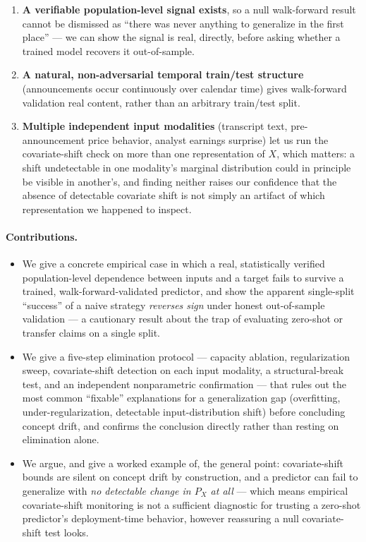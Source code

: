 \documentclass[11pt]{article}
\begin{document}
\begin{enumerate}
  \item \textbf{A verifiable population-level signal exists}, so a null walk-forward result cannot be dismissed as ``there was never anything to generalize in the first place'' --- we can show the signal is real, directly, before asking whether a trained model recovers it out-of-sample.
  \item \textbf{A natural, non-adversarial temporal train/test structure} (announcements occur continuously over calendar time) gives walk-forward validation real content, rather than an arbitrary train/test split.
  \item \textbf{Multiple independent input modalities} (transcript text, pre-announcement price behavior, analyst earnings surprise) let us run the covariate-shift check on more than one representation of $X$, which matters: a shift undetectable in one modality's marginal distribution could in principle be visible in another's, and finding neither raises our confidence that the absence of detectable covariate shift is not simply an artifact of which representation we happened to inspect.
\end{enumerate}

\paragraph{Contributions.}
\begin{itemize}
  \item We give a concrete empirical case in which a real, statistically verified population-level dependence between inputs and a target fails to survive a trained, walk-forward-validated predictor, and show the apparent single-split ``success'' of a naive strategy \emph{reverses sign} under honest out-of-sample validation --- a cautionary result about the trap of evaluating zero-shot or transfer claims on a single split.
  \item We give a five-step elimination protocol --- capacity ablation, regularization sweep, covariate-shift detection on each input modality, a structural-break test, and an independent nonparametric confirmation --- that rules out the most common ``fixable'' explanations for a generalization gap (overfitting, under-regularization, detectable input-distribution shift) before concluding concept drift, and confirms the conclusion directly rather than resting on elimination alone.
  \item We argue, and give a worked example of, the general point: covariate-shift bounds are silent on concept drift by construction, and a predictor can fail to generalize with \emph{no detectable change in $P_X$ at all} --- which means empirical covariate-shift monitoring is not a sufficient diagnostic for trusting a zero-shot predictor's deployment-time behavior, however reassuring a null covariate-shift test looks.
\end{itemize}
\end{document}
